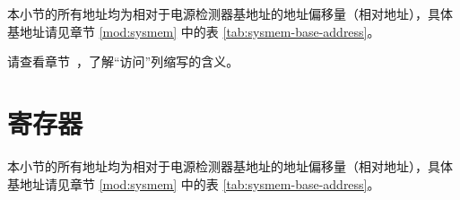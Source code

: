 \documentclass[main\_\_CN.tex]{subfiles}
\begin{document}
本小节的所有地址均为相对于电源检测器基地址的地址偏移量（相对地址），具体基地址请见章节 \ref{mod:sysmem} \textit{} 中的表 \ref{tab:sysmem-base-address}。

请查看章节\ ，了解“访问”列缩写的含义。






\newpage
\section{寄存器}

本小节的所有地址均为相对于电源检测器基地址的地址偏移量（相对地址），具体基地址请见章节 \ref{mod:sysmem} \textit{} 中的表 \ref{tab:sysmem-base-address}。



\end{document}
